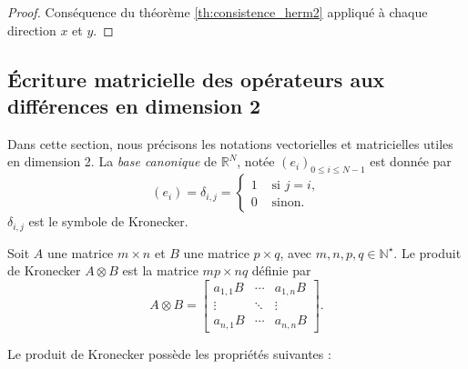 \begin{proof}
Conséquence du théorème \ref{th:consistence_herm2} appliqué à chaque direction $x$ et $y$.
\end{proof}

























\subsection{Écriture matricielle des opérateurs aux différences en dimension 2}

Dans cette section, nous précisons les notations vectorielles et matricielles utiles en dimension 2.
La \textit{base canonique} de $\mathbb{R}^N$, notée $\left(e_i \right)_{0 \leq i \leq N-1}$ est donnée par 
\begin{equation}
\left( e_i \right) = \delta_{i,j} = \left\lbrace
\begin{array}{rl}
1 & \text{ si } j=i,\\
0 & \text{ sinon.}
\end{array}
\right.
\end{equation}
$\delta_{i,j}$ est le symbole de Kronecker.

\begin{definition}
Soit $A$ une matrice $m \times n$ et $B$ une matrice $p \times q$, avec $m, n, p, q \in \mathbb{N}^{\star}$. Le produit de Kronecker $A \otimes B$ est la matrice $mp \times nq$ définie par
\begin{equation}
A \otimes B = 
\begin{bmatrix}
a_{1,1}B & \cdots & a_{1,n}B \\ 
\vdots & \ddots & \vdots \\ 
a_{n,1}B & \cdots & a_{n,n}B
\end{bmatrix} .
\end{equation}
\end{definition}
Le produit de Kronecker possède les propriétés suivantes \cite{VanLoan1992} :

